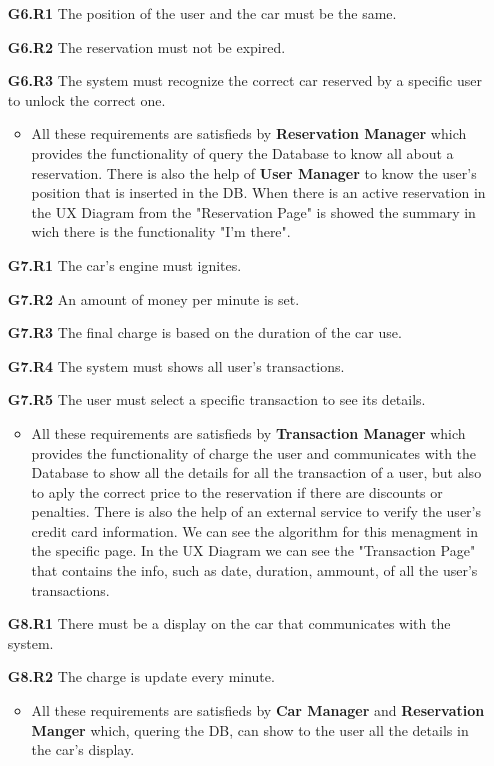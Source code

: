 \begin{itemize}
\item[\textbf{G6.R1}] The position of the user and the car must be the same.
\item[\textbf{G6.R2}] The reservation must not be expired.
\item[\textbf{G6.R3}] The system must recognize the correct car reserved by a specific user to unlock the correct one.
\begin{itemize}
\item All these requirements are satisfieds by \textbf{Reservation Manager} which provides the functionality of query the Database to know all about a reservation. There is also the help of \textbf{User Manager} to know the user's position that is inserted in the DB. When there is an active reservation in the UX Diagram from the "Reservation Page" is showed the summary in wich there is the functionality "I'm there".
\end{itemize}

\item[\textbf{G7.R1}] The car's engine must ignites.
\item[\textbf{G7.R2}] An amount of money per minute is set.
\item[\textbf{G7.R3}] The final charge is based on the duration of the car use.
\item[\textbf{G7.R4}] The system must shows all user's transactions.
\item[\textbf{G7.R5}] The user must select a specific transaction to see its details.
\begin{itemize}
\item All these requirements are satisfieds by \textbf{Transaction Manager} which provides the functionality of charge the user and communicates with the Database to show all the details for all the transaction of a user, but also to aply the correct price to the reservation if there are discounts or penalties. There is also the help of an external service to verify the user's credit card information. We can see the algorithm for this menagment in the specific page. In the UX Diagram we can see the "Transaction Page" that contains the info, such as date, duration, ammount, of all the user's transactions.
\end{itemize}

\item[\textbf{G8.R1}] There must be a display on the car that communicates with the system.
\item[\textbf{G8.R2}] The charge is update every minute.
\begin{itemize}
\item All these requirements are satisfieds by \textbf{Car Manager} and \textbf{Reservation Manger} which, quering the DB, can show to the user all the details in the car's display.
\end{itemize}


\end{itemize}
